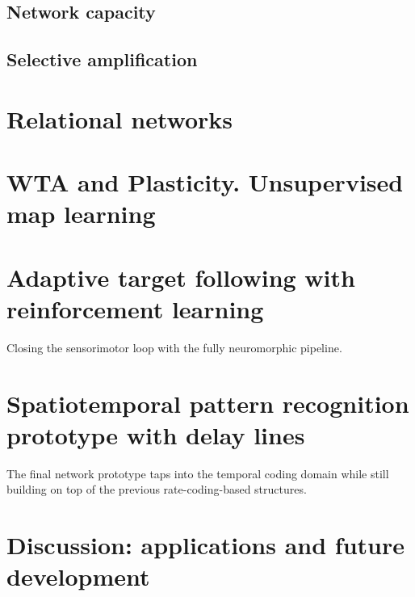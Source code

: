 \subsection{Network capacity}
\subsection{Selective amplification}

\section{Relational networks}

\section{WTA and Plasticity. Unsupervised map learning}

\section{Adaptive target following with reinforcement learning}

Closing the sensorimotor loop with the fully neuromorphic pipeline.

\section{Spatiotemporal pattern recognition prototype with delay lines}

The final network prototype taps into the temporal coding domain while still building on top of the previous rate-coding-based structures. 



\section{Discussion: applications and future development}